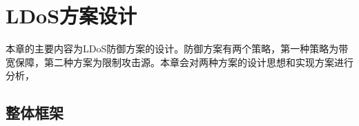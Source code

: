 \chapter{LDoS方案设计}
\label{cha:design}
本章的主要内容为LDoS防御方案的设计。防御方案有两个策略，第一种策略为带宽保障，第二种方案为限制攻击源。本章会对两种方案的设计思想和实现方案进行分析，

\section{整体框架}
\label{chap4:architecture}